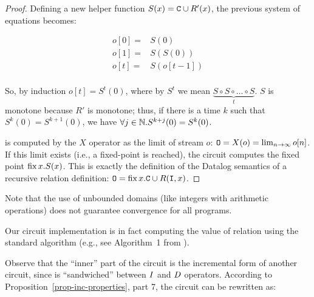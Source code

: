 \begin{proof}
Defining a new helper function $S(x) = \mbox{\texttt{C}} \cup R'(x)$, the previous system of equations becomes:

$$
\begin{aligned}
o[0] =& S(0) \\
o[1] =& S(S(0)) \\
o[t] =& S(o[t-1]) \\
\end{aligned}
$$

So, by induction $o[t] = S^t(0)$, where by $S^t$ we mean $\underbrace{S \circ S \circ \ldots \circ S}_{t}$.
$S$ is monotone because $R'$ is monotone; thus, if there is a time $k$ such that $S^k(0) = S^{k+1}(0)$, we have
$\forall j \in \mathbb{N} . S^{k+j}(0) = S^k(0)$.

 is computed by the $X$ operator as the limit of stream $o$:
$\mbox{\texttt{O}} = X(o) = \lim_{n \to \infty} o[n]$.  If this limit exists (i.e., a fixed-point
is reached), the circuit computes the fixed point $\mbox{fix}\,x.S(x)$.  This is exactly
the definition of the Datalog semantics of a recursive relation definition: $\mbox{\texttt{O}} =
\mbox{fix}\,x.\mbox{\texttt{C}} \cup R(\mbox{\texttt{I}}, x)$.
\end{proof}

Note that the use of unbounded domains (like integers with arithmetic operations) does
not guarantee convergence for all programs.

Our circuit implementation is in fact computing the value of relation  using the standard
 algorithm (e.g., see Algorithm~1 from \cite{greco-sldm15}).

Observe that the ``inner'' part of the circuit is the incremental
form of another circuit, since is ``sandwiched'' between $\mathit{I}$ and $\mathit{D}$ operators.
According to Proposition~\ref{prop-inc-properties}, part 7, the circuit can be
rewritten as:

\begin{center}
\end{center}

